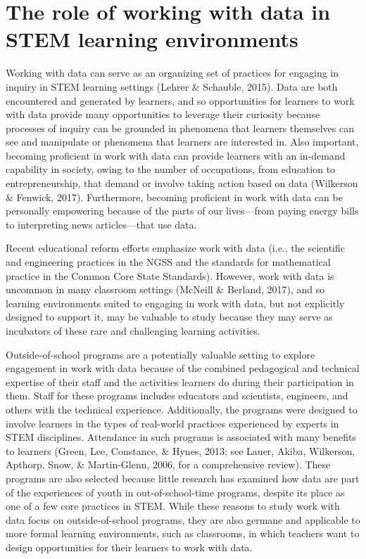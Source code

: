 \documentclass[]{book}
\theoremstyle{definition}
\theoremstyle{definition}
\theoremstyle{definition}
\theoremstyle{remark}
\begin{document}
\section{The role of working with data in STEM learning
environments}\label{the-role-of-working-with-data-in-stem-learning-environments}

Working with data can serve as an organizing set of practices for
engaging in inquiry in STEM learning settings (Lehrer \& Schauble,
2015). Data are both encountered and generated by learners, and so
opportunities for learners to work with data provide many opportunities
to leverage their curiosity because processes of inquiry can be grounded
in phenomena that learners themselves can see and manipulate or
phenomena that learners are interested in. Also important, becoming
proficient in work with data can provide learners with an in-demand
capability in society, owing to the number of occupations, from
education to entrepreneurship, that demand or involve taking action
based on data (Wilkerson \& Fenwick, 2017). Furthermore, becoming
proficient in work with data can be personally empowering because of the
parts of our lives---from paying energy bills to interpreting news
articles---that use data.

Recent educational reform efforts emphasize work with data (i.e., the
scientific and engineering practices in the NGSS and the standards for
mathematical practice in the Common Core State Standards). However, work
with data is uncommon in many classroom settings (McNeill \& Berland,
2017), and so learning environments suited to engaging in work with
data, but not explicitly designed to support it, may be valuable to
study because they may serve as incubators of these rare and challenging
learning activities.

Outside-of-school programs are a potentially valuable setting to explore
engagement in work with data because of the combined pedagogical and
technical expertise of their staff and the activities learners do during
their participation in them. Staff for these programs includes educators
and scientists, engineers, and others with the technical experience.
Additionally, the programs were designed to involve learners in the
types of real-world practices experienced by experts in STEM
disciplines. Attendance in such programs is associated with many
benefits to learners (Green, Lee, Constance, \& Hynes, 2013; see Lauer,
Akiba, Wilkerson, Apthorp, Snow, \& Martin-Glenn, 2006, for a
comprehensive review). These programs are also selected because little
research has examined how data are part of the experiences of youth in
out-of-school-time programs, despite its place as one of a few core
practices in STEM. While these reasons to study work with data focus on
outside-of-school programs, they are also germane and applicable to more
formal learning environments, such as classrooms, in which teachers want
to design opportunities for their learners to work with data.
\end{document}
